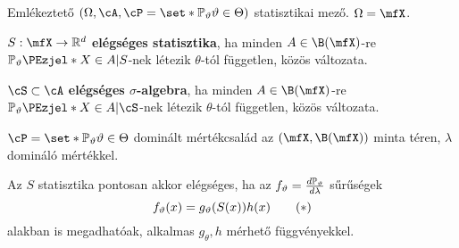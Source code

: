 \documentclass[aspectratio=169,notheorems,9pt,\option]{beamer}
\begin{document}
\maketitle

\begin{frame}{Emlékeztető}
  $(\Omega,\cA,\cP=\set*{\P[\theta]}{\theta\in\Theta})$ statisztikai mező. $\Omega=\mfX$.  
  \begin{df} 
    $S:\mfX\to\real^d$ \textbf{elégséges statisztika}, ha minden $A\in\B(\mfX)$-re $\P[\theta]{X\in A|S}$-nek 
    létezik $\theta$-tól független, közös változata.

    $\cS\subset\cA$ \textbf{elégséges $\sigma$-algebra}, ha minden $A\in\B(\mfX)$-re $\P[\theta]{X\in A|\cS}$-nek 
    létezik $\theta$-tól független, közös változata.
  \end{df}
  \begin{theorem}
    $\cP=\set*{\P[\theta]}{\theta\in\Theta}$ dominált mértékcsalád az 
    $(\mfX,\B(\mfX))$ minta téren, $\lambda$ domináló mértékkel. 
    
    Az $S$  statisztika pontosan akkor elégséges, ha az 
    $f_\theta=\frac{d\P[\theta]}{d\lambda}$ 
    sűrűségek
    \begin{displaymath}
      f_{\theta}(x)=g_{\theta}(S(x))h(x)  \tag{\hbox{${*}$}}
    \end{displaymath}
    alakban is megadhatóak, 
    alkalmas $g_\theta,h$ mérhető függvényekkel.
  \end{theorem}
  
\end{frame}
\end{document}
